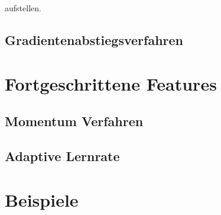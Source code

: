 \documentclass{article}
\theoremstyle{plain} %
\theoremstyle{definition} %
\begin{document}
aufstellen.

\subsection{Gradientenabstiegsverfahren}

\section{Fortgeschrittene Features}
\subsection{Momentum Verfahren}
\subsection{Adaptive Lernrate}

\section{Beispiele}



\end{document}
